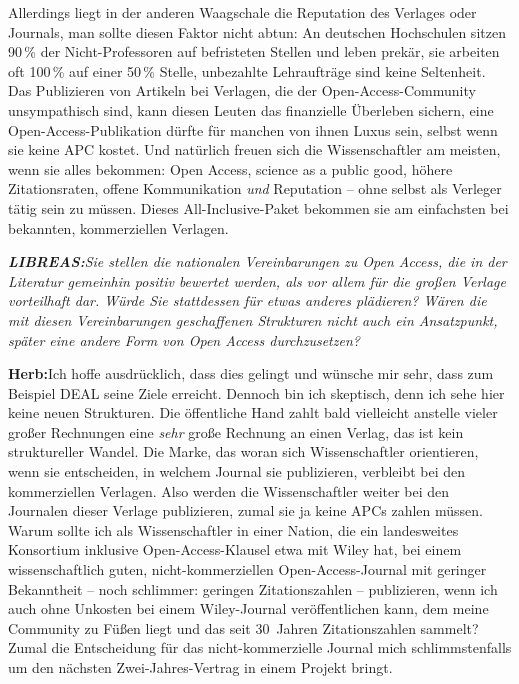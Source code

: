 \documentclass[a4paper,
fontsize=11pt,
oneside,
numbers=noperiodatend,
parskip=half-,
bibliography=totoc,
final
]{scrartcl}
\begin{document}
Allerdings liegt in der anderen Waagschale die Reputation des Verlages
oder Journals, man sollte diesen Faktor nicht abtun: An deutschen
Hochschulen sitzen 90\,\% der Nicht-Professoren auf befristeten Stellen
und leben prekär, sie arbeiten oft 100\,\% auf einer 50\,\% Stelle,
unbezahlte Lehraufträge sind keine Seltenheit. Das Publizieren von
Artikeln bei Verlagen, die der Open-Access-Community unsympathisch sind,
kann diesen Leuten das finanzielle Überleben sichern, eine
Open-Access-Publikation dürfte für manchen von ihnen Luxus sein, selbst
wenn sie keine APC kostet. Und natürlich freuen sich die Wissenschaftler
am meisten, wenn sie alles bekommen: Open Access, science as a public
good, höhere Zitationsraten, offene Kommunikation \emph{und} Reputation
-- ohne selbst als Verleger tätig sein zu müssen. Dieses
All-Inclusive-Paket bekommen sie am einfachsten bei bekannten,
kommerziellen Verlagen.

\emph{\textbf{LIBREAS:}Sie stellen die nationalen Vereinbarungen zu Open
Access, die in der Literatur gemeinhin positiv bewertet werden, als vor
allem für die großen Verlage vorteilhaft dar. Würde Sie stattdessen für
etwas anderes plädieren? Wären die mit diesen Vereinbarungen
geschaffenen Strukturen nicht auch ein Ansatzpunkt, später eine andere
Form von Open Access durchzusetzen?}

\textbf{Herb:}Ich hoffe ausdrücklich, dass dies gelingt und wünsche mir
sehr, dass zum Beispiel DEAL seine Ziele erreicht. Dennoch bin ich
skeptisch, denn ich sehe hier keine neuen Strukturen. Die öffentliche
Hand zahlt bald vielleicht anstelle vieler großer Rechnungen eine
\emph{sehr} große Rechnung an einen Verlag, das ist kein struktureller
Wandel. Die Marke, das woran sich Wissenschaftler orientieren, wenn sie
entscheiden, in welchem Journal sie publizieren, verbleibt bei den
kommerziellen Verlagen. Also werden die Wissenschaftler weiter bei den
Journalen dieser Verlage publizieren, zumal sie ja keine APCs zahlen
müssen. Warum sollte ich als Wissenschaftler in einer Nation, die ein
landesweites Konsortium inklusive Open-Access-Klausel etwa mit Wiley
hat, bei einem wissenschaftlich guten, nicht-kommerziellen
Open-Access-Journal mit geringer Bekanntheit -- noch schlimmer: geringen
Zitationszahlen -- publizieren, wenn ich auch ohne Unkosten bei einem
Wiley-Journal veröffentlichen kann, dem meine Community zu Füßen liegt
und das seit 30~Jahren Zitationszahlen sammelt? Zumal die Entscheidung
für das nicht-kommerzielle Journal mich schlimmstenfalls um den nächsten
Zwei-Jahres-Vertrag in einem Projekt bringt.
\end{document}
